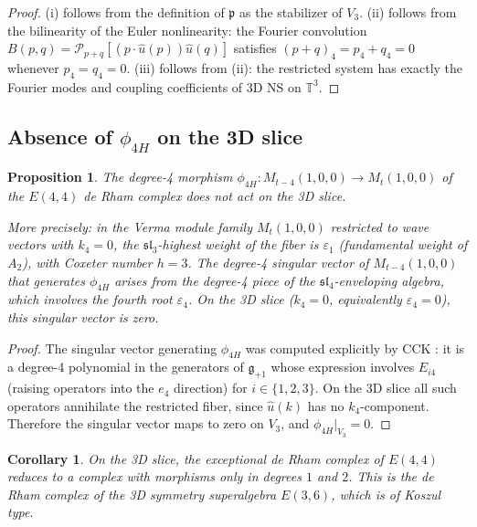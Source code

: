 \documentclass[reqno,10pt]{amsart}
\theoremstyle{plain}
\newtheorem{proposition}[theorem]{Proposition}
\newtheorem{corollary}[theorem]{Corollary}
\theoremstyle{definition}
\def\slN{{\mathfrak{sl}}_4}
\def\sliii{{\mathfrak{sl}}_3}
\def\gE{E(4,4)}
\def\gEiii{E(3,6)}
\def\pfrak{\mathfrak{p}}
\begin{document}
\begin{proof}
  (i) follows from the definition of $\pfrak$ as the stabilizer of $V_3$.
  (ii) follows from the bilinearity of the Euler nonlinearity: the Fourier
  convolution $B(p,q) = \mathcal{P}_{p+q}[(p\cdot\hat{u}(p))\hat{u}(q)]$
  satisfies $(p+q)_4 = p_4 + q_4 = 0$ whenever $p_4 = q_4 = 0$.
  (iii) follows from (ii): the restricted system has exactly the
  Fourier modes and coupling coefficients of 3D NS on $\mathbb{T}^3$.
\end{proof}

\subsection{Absence of $\phi_{4H}$ on the 3D slice}

\begin{proposition}\label{prop:no4H}
  The degree-4 morphism $\phi_{4H}: M_{t-4}(1,0,0) \to M_t(1,0,0)$
  of the $E(4,4)$ de Rham complex does not act on the 3D slice.

  More precisely: in the Verma module family $M_t(1,0,0)$ restricted to
  wave vectors with $k_4 = 0$, the $\sliii$-highest weight of the fiber
  is $\varepsilon_1$ (fundamental weight of $A_2$), with Coxeter number
  $h = 3$.  The degree-4 singular vector of $M_{t-4}(1,0,0)$ that generates
  $\phi_{4H}$ arises from the degree-4 piece of the $\slN$-enveloping algebra,
  which involves the fourth root $\varepsilon_4$.  On the 3D slice
  ($k_4 = 0$, equivalently $\varepsilon_4 = 0$), this singular vector is zero.
\end{proposition}

\begin{proof}
  The singular vector generating $\phi_{4H}$ was computed explicitly by
  CCK \cite{CCK2026}: it is a degree-4 polynomial in the generators of
  $\mathfrak{g}_{+1}$ whose expression involves $E_{i4}$ (raising operators
  into the $e_4$ direction) for $i \in \{1,2,3\}$.  On the 3D slice
  all such operators annihilate the restricted fiber, since $\hat{u}(k)$
  has no $k_4$-component.  Therefore the singular vector maps to zero
  on $V_3$, and $\phi_{4H}|_{V_3} = 0$.
\end{proof}

\begin{corollary}\label{cor:complex_3d}
  On the 3D slice, the exceptional de Rham complex of $\gE$ reduces to a
  complex with morphisms only in degrees $1$ and $2$.  This is the de Rham
  complex of the 3D symmetry superalgebra $\gEiii$, which is of Koszul type.
\end{corollary}
\end{document}
